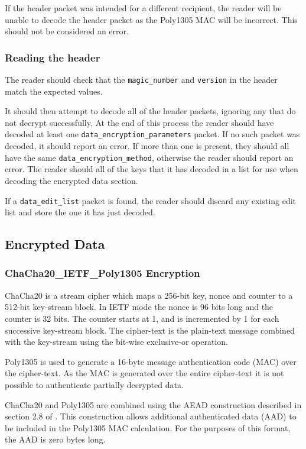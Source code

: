\documentclass[10pt]{article}
\newcommand{\kw}[1]{\texttt{#1}}
\begin{document}
If the header packet was intended for a different recipient, the reader will be unable to decode the header packet
as the Poly1305 MAC will be incorrect.
This should not be considered an error.

\subsubsection{Reading the header}

The reader should check that the \kw{magic\_number} and \kw{version} in the header match the expected values.

It should then attempt to decode all of the header packets, ignoring any that do not decrypt successfully.
At the end of this process the reader should have decoded at least one \kw{data\_encryption\_parameters} packet.
If no such packet was decoded, it should report an error.
If more than one is present, they should all have the same \kw{data\_encryption\_method}, otherwise the reader
should report an error.
The reader should all of the keys that it has decoded in a list for use when decoding the encrypted data section.

If a \kw{data\_edit\_list} packet is found, the reader should discard any existing edit list and store the
one it has just decoded.

\subsection{Encrypted Data}
\subsubsection{ChaCha20\_IETF\_Poly1305 Encryption}\label{data:chacha20_encryption}

ChaCha20 is a stream cipher which maps a 256-bit key, nonce and counter to a 512-bit key-stream block.
In IETF mode the nonce is 96 bits long and the counter is 32 bits.
The counter starts at 1, and is incremented by 1 for each successive key-stream block.
The cipher-text is the plain-text message combined with the key-stream using the bit-wise exclusive-or operation.

Poly1305 is used to generate a 16-byte message authentication code (MAC) over the cipher-text.
As the MAC is generated over the entire cipher-text it is not possible to authenticate partially decrypted data.

ChaCha20 and Poly1305 are combined using the AEAD construction described in section 2.8 of \cite{RFC8439}.
This construction allows additional authenticated data (AAD) to be included in the Poly1305 MAC calculation.
For the purposes of this format, the AAD is zero bytes long.
\end{document}
